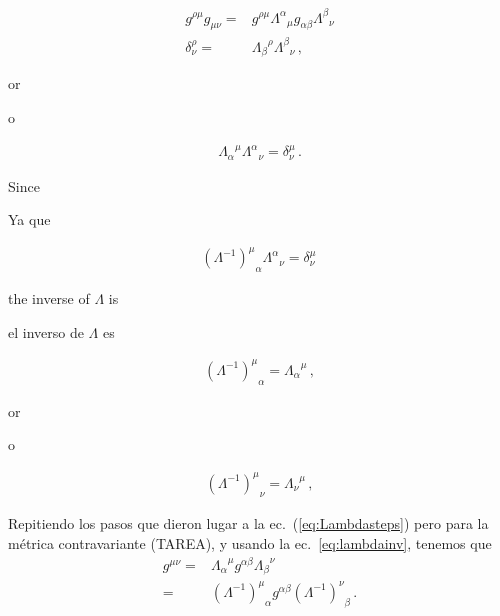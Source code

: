 \begin{frame}
\begin{align}
  g^{\rho\mu}g_{\mu\nu}=&g^{\rho\mu}{\Lambda^\alpha}_{\mu}g_{\alpha\beta}{\Lambda^\beta}_{\nu}\nonumber\\
  \delta^\rho_\nu=&{\Lambda_\beta}^\rho{\Lambda^\beta}_{\nu}\,,
\end{align}
\begin{english}
or  
\end{english}
\begin{spanish}
o
\end{spanish}
\begin{align}
  {\Lambda_\alpha}^\mu{\Lambda^\alpha}_{\nu}=\delta^\mu_\nu\,.
\end{align}
\begin{english}
Since
\end{english}
\begin{spanish}
Ya que
\end{spanish}
\begin{align}
  {\left(\Lambda^{-1}\right)^\mu}_\alpha{\Lambda^\alpha}_{\nu}=\delta^\mu_\nu\,
\end{align}
\begin{english}
the inverse of $\Lambda$ is
\end{english}
\begin{spanish}
el inverso de $\Lambda$ es
\end{spanish}
\begin{align}
  {\left(\Lambda^{-1}\right)^\mu}_\alpha={\Lambda_\alpha}^\mu\,,
\end{align}
\begin{english}
or  
\end{english}
\begin{spanish}
o
\end{spanish}
\begin{align}
\label{eq:lambdainv}
  {\left(\Lambda^{-1}\right)^\mu}_\nu={\Lambda_\nu}^\mu\,,
\end{align}

Repitiendo los pasos que dieron lugar a la ec.~(\ref{eq:Lambdasteps})
pero para la métrica contravariante (TAREA), y usando la
ec.~\eqref{eq:lambdainv}, tenemos que
\begin{align}
  \label{eq:Lambdacontra}
  g^{\mu\nu}=&{\Lambda_{\alpha}}^{\mu}g^{\alpha\beta}{\Lambda_{\beta}}^{\nu}\nonumber\\
           =&{\left( \Lambda^{-1} \right)^{\mu}}_{\alpha}g^{\alpha\beta} {\left( \Lambda^{-1} \right)^{\nu}}_{\beta}\,.
\end{align}

\end{frame}

